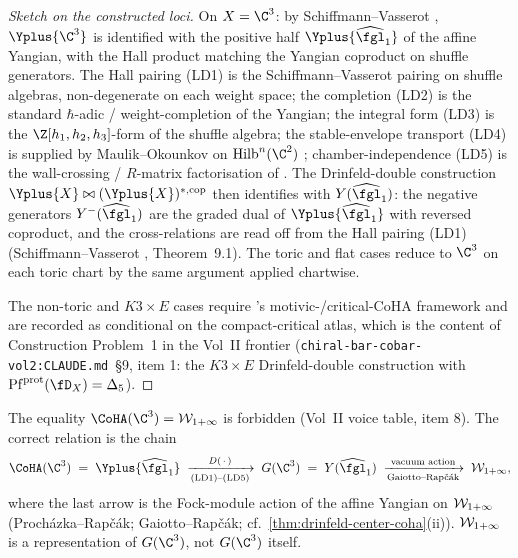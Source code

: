 \begin{proof}[Sketch on the constructed loci]
On $X = \C^3$: by Schiffmann--Vasserot
\cite{SchiffmannVasserot2013}, $\Yplus{\C^3}$ is identified with the
positive half $\Yplus{\widehat{\fgl}_1}$ of the affine Yangian, with
the Hall product matching the Yangian coproduct on shuffle generators.
The Hall pairing \textup{(LD1)} is the Schiffmann--Vasserot pairing on
shuffle algebras, non-degenerate on each weight space; the completion
\textup{(LD2)} is the standard $\hbar$-adic / weight-completion of the
Yangian; the integral form \textup{(LD3)} is the
$\Z[h_1, h_2, h_3]$-form of the shuffle algebra; the stable-envelope
transport \textup{(LD4)} is supplied by Maulik--Okounkov on
$\mathrm{Hilb}^n(\C^2)$ \cite{MaulikOkounkov2012}; chamber-independence
\textup{(LD5)} is the wall-crossing / $R$-matrix factorisation of
\cite[\S 3]{MaulikOkounkov2012}. The Drinfeld-double construction
$\Yplus{X} \bowtie (\Yplus{X})^{\ast,\mathrm{cop}}$ then identifies
with $Y(\widehat{\fgl}_1)$: the negative generators
$Y^-(\widehat{\fgl}_1)$ are the graded dual of $\Yplus{\widehat{\fgl}_1}$
with reversed coproduct, and the cross-relations are read off from the
Hall pairing \textup{(LD1)} \textup{(}Schiffmann--Vasserot
\cite{SchiffmannVasserot2013}, Theorem~9.1\textup{)}. The toric and
flat cases reduce to $\C^3$ on each toric chart by the same argument
applied chartwise.

The non-toric and $K3 \times E$ cases require
\cite{KontsevichSoibelman2008}'s motivic-/critical-CoHA framework and
are recorded as conditional on the compact-critical atlas, which is the
content of Construction Problem~1 in the Vol~II frontier
\textup{(}\texttt{chiral-bar-cobar-vol2:CLAUDE.md}~\S 9, item 1: the
$K3 \times E$ Drinfeld-double construction with $\protectedPfaff{
\fD_X} = \Delta_5$\textup{)}.
\end{proof}

\begin{remark}
The equality $\CoHA(\C^3) = \Wonepinf$ is forbidden
\textup{(}Vol~II voice table, item 8\textup{)}. The correct relation
is the chain
\[
 \CoHA(\C^3) \;=\; \Yplus{\widehat{\fgl}_1}
 \;\xrightarrow[\textup{(LD1)--(LD5)}]{\Drinfdouble{\,\cdot\,}}\;
 G(\C^3) \;=\; Y(\widehat{\fgl}_1)
 \;\xrightarrow[\text{Gaiotto--Rap\v{c}\'ak}]{\text{vacuum action}}\;
 \Wonepinf,
\]
where the last arrow is the Fock-module action of the affine Yangian on
$\mathcal{W}_{1+\infty}$ \textup{(}Proch\'azka--Rap\v{c}\'ak; Gaiotto--Rap\v{c}\'ak;
cf.\ \cref{thm:drinfeld-center-coha}\textup{(ii)}\textup{)}.
$\mathcal{W}_{1+\infty}$ is a representation of $G(\C^3)$, not $G(\C^3)$ itself.
\end{remark}

